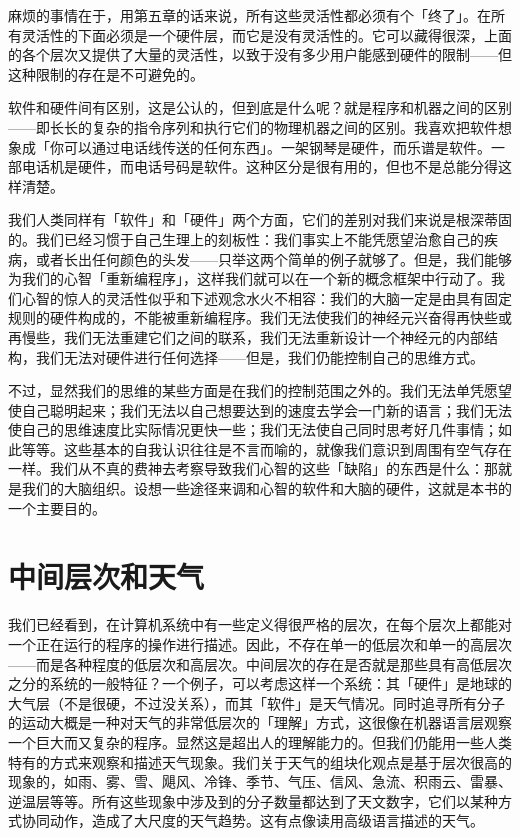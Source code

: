\documentclass[
  12pt,
  twoside,
  openright,
  oldfontcommands,
]{memoir}
\begin{document}
麻烦的事情在于，用第五章的话来说，所有这些灵活性都必须有个「终了」。在所有灵活性的下面必须是一个硬件层，而它是没有灵活性的。它可以藏得很深，上面的各个层次又提供了大量的灵活性，以致于没有多少用户能感到硬件的限制------但这种限制的存在是不可避免的。

软件和硬件间有区别，这是公认的，但到底是什么呢？就是程序和机器之间的区别------即长长的复杂的指令序列和执行它们的物理机器之间的区别。我喜欢把软件想象成「你可以通过电话线传送的任何东西」。一架钢琴是硬件，而乐谱是软件。一部电话机是硬件，而电话号码是软件。这种区分是很有用的，但也不是总能分得这样清楚。

我们人类同样有「软件」和「硬件」两个方面，它们的差别对我们来说是根深蒂固的。我们已经习惯于自己生理上的刻板性：我们事实上不能凭愿望治愈自己的疾病，或者长出任何颜色的头发------只举这两个简单的例子就够了。但是，我们能够为我们的心智「重新编程序」，这样我们就可以在一个新的概念框架中行动了。我们心智的惊人的灵活性似乎和下述观念水火不相容：我们的大脑一定是由具有固定规则的硬件构成的，不能被重新编程序。我们无法使我们的神经元兴奋得再快些或再慢些，我们无法重建它们之间的联系，我们无法重新设计一个神经元的内部结构，我们无法对硬件进行任何选择------但是，我们仍能控制自己的思维方式。

不过，显然我们的思维的某些方面是在我们的控制范围之外的。我们无法单凭愿望使自己聪明起来；我们无法以自己想要达到的速度去学会一门新的语言；我们无法使自己的思维速度比实际情况更快一些；我们无法使自己同时思考好几件事情；如此等等。这些基本的自我认识往往是不言而喻的，就像我们意识到周围有空气存在一样。我们从不真的费神去考察导致我们心智的这些「缺陷」的东西是什么：那就是我们的大脑组织。设想一些途径来调和心智的软件和大脑的硬件，这就是本书的一个主要目的。

\section{中间层次和天气}

我们已经看到，在计算机系统中有一些定义得很严格的层次，在每个层次上都能对一个正在运行的程序的操作进行描述。因此，不存在单一的低层次和单一的高层次------而是各种程度的低层次和高层次。中间层次的存在是否就是那些具有高低层次之分的系统的一般特征？一个例子，可以考虑这样一个系统：其「硬件」是地球的大气层（不是很硬，不过没关系），而其「软件」是天气情况。同时追寻所有分子的运动大概是一种对天气的非常低层次的「理解」方式，这很像在机器语言层观察一个巨大而又复杂的程序。显然这是超出人的理解能力的。但我们仍能用一些人类特有的方式来观察和描述天气现象。我们关于天气的组块化观点是基于层次很高的现象的，如雨、雾、雪、飓风、冷锋、季节、气压、信风、急流、积雨云、雷暴、逆温层等等。所有这些现象中涉及到的分子数量都达到了天文数字，它们以某种方式协同动作，造成了大尺度的天气趋势。这有点像读用高级语言描述的天气。
\end{document}
